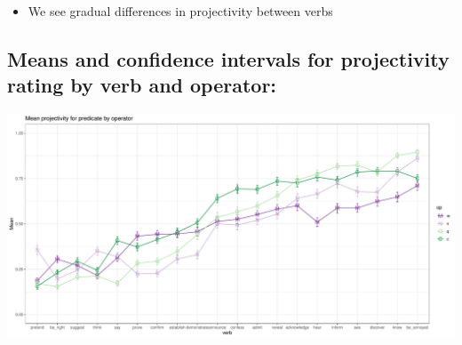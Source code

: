 \documentclass[10pt]{article}\usepackage[]{graphicx}\usepackage[dvipsnames]{xcolor}
\newenvironment{knitrout}{}{} %
\begin{document}
\begin{itemize}
  \item We see gradual differences in projectivity between verbs
\end{itemize}

\subsection{Means and confidence intervals for projectivity rating by verb and operator:}
\begin{knitrout}
\color{fgcolor}

{\centering \includegraphics[width=\linewidth]{figures/figuressummary-combined-1} 

}


\end{knitrout}
\end{document}
